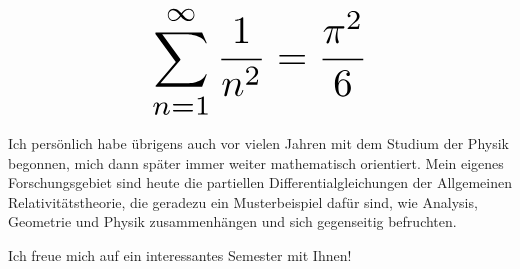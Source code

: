 \begin{multicols}{2}
\[
\resizebox{0.45\hsize}{!}{$\displaystyle\sum_{n = 1}^\infty \frac{1}{n^2} = \frac{\pi^2}{6}$}
\]

Ich persönlich habe übrigens auch vor vielen Jahren mit dem Studium der Physik begonnen, mich dann später immer weiter mathematisch orientiert. Mein eigenes Forschungsgebiet sind heute die partiellen Differentialgleichungen der Allgemeinen Relativitätstheorie, die geradezu ein Musterbeispiel dafür sind, wie Analysis, Geometrie und Physik zusammenhängen und sich gegenseitig befruchten.

Ich freue mich auf ein interessantes Semester mit Ihnen!

\end{multicols}

\begin{center}
\end{center}
